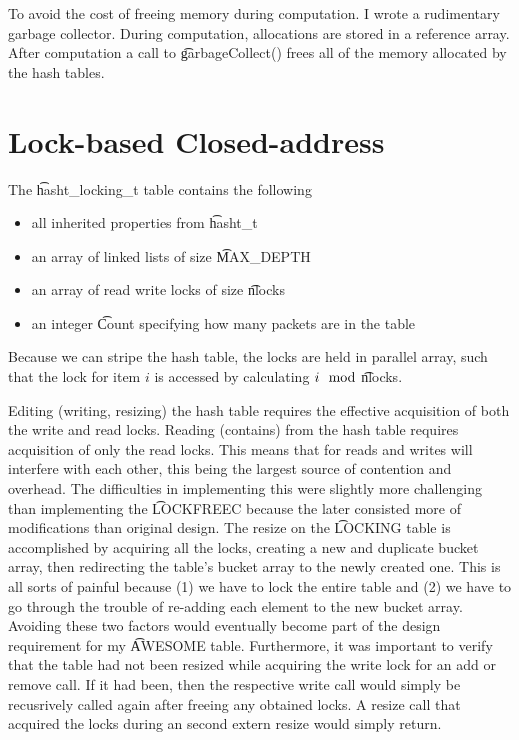 To avoid the cost of freeing memory during computation. I wrote a
rudimentary garbage collector. During computation, allocations are
stored in a reference array.  After computation a call to
\t{garbageCollect()} frees all of the memory allocated by the hash
tables.


\section{Lock-based Closed-address}

The \t{hasht\_locking\_t} table contains the following
\begin{itemize}
\item all inherited properties from \t{hasht\_t}
\item an array of linked lists of size \t{MAX\_DEPTH}
\item an array of read write locks of size \t{nlocks}
\item an integer \t{Count} specifying how many packets are in the table
\end{itemize}

Because we can stripe the hash table, the locks are held in parallel
array, such that the lock for item $i$ is accessed by calculating
$i \mod$\t{nlocks}.

Editing (writing, resizing) the hash table requires the effective
acquisition of both the write and read locks. Reading (contains) from
the hash table requires acquisition of only the read locks.  This
means that for reads and writes will interfere with each other, this
being the largest source of contention and overhead.  The difficulties
in implementing this were slightly more challenging than implementing
the \t{LOCKFREEC} because the later consisted more of modifications
than original design. The resize on the \t{LOCKING} table is
accomplished by acquiring all the locks, creating a new and duplicate
bucket array, then redirecting the table's bucket array to the newly
created one.  This is all sorts of painful because (1) we have to lock
the entire table and (2) we have to go through the trouble of
re-adding each element to the new bucket array.  Avoiding these two
factors would eventually become part of the design requirement for my
\t{AWESOME} table.  Furthermore, it was important to verify that the
table had not been resized while acquiring the write lock for an add
or remove call. If it had been, then the respective write call would
simply be recusrively called again after freeing any obtained locks. A
resize call that acquired the locks during an second extern resize
would simply return.


